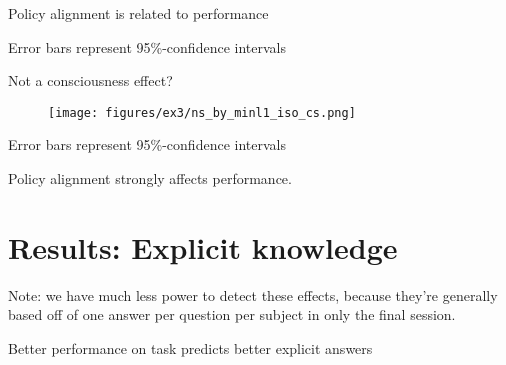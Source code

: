 \documentclass{beamer}
\begin{document}
\begin{frame}{Policy alignment is related to performance}
\begin{figure}
\centering
{}
\end{figure}
{\scriptsize Error bars represent 95\%-confidence intervals}
\end{frame}

\begin{frame}{Not a consciousness effect?}
\begin{figure}
\centering
\texttt{[image: figures/ex3/ns\_by\_minl1\_iso\_cs.png]}
\end{figure}
{\scriptsize Error bars represent 95\%-confidence intervals}
\end{frame}

\begin{frame}[standout]
Policy alignment strongly affects performance. \par
{}
\end{frame}

\section{Results: Explicit knowledge}


\begin{frame}
Note: we have much less power to detect these effects, because they're generally based off of one answer per question per subject in only the final session.
\end{frame}

\begin{frame}{Better performance on task predicts better explicit answers}
\begin{figure}
\centering
{} 
\end{figure}
\end{frame}
\end{document}
